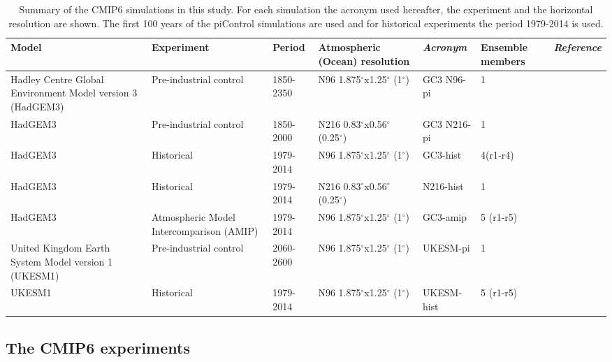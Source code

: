 \begin{sidewaystable}
\small
\caption{Summary of the CMIP6 simulations in this study. For each simulation the acronym used hereafter, the experiment and the horizontal resolution are shown. The first 100 years of the piControl simulations are used and for historical experiments the period 1979-2014 is used.}
\begin{tabular}{p{4.5cm}|p{}p{}p{2.95cm}p{2.53cm}p{2cm}p{3.8cm}} \label{tab:Sexps} \small
 Model & Experiment & Period & Atmospheric (Ocean) resolution & \textit{Acronym}  & Ensemble members & \textit{Reference}                 \\ \hline \hline

Hadley Centre Global Environment Model version 3 (HadGEM3)    &  Pre-industrial control  & 1850-2350 & N96 1.875$^\circ$x1.25$^\circ$ (1$^\circ$) & GC3 N96-pi      & 1 &   \citep{menary2018,gc3pi}                          \\
HadGEM3   &  Pre-industrial control & 1850-2000        & N216 0.83$^\circ$x0.56$^\circ$ (0.25$^\circ$) & GC3 N216-pi   & 1 & \citep{menary2018,n216pi}      \\
HadGEM3    &  Historical & 1979-2014       & N96 1.875$^\circ$x1.25$^\circ$ (1$^\circ$)  & GC3-hist     &  4(r1-r4) & \citep{andrews2020,gc3hist}                          \\
HadGEM3   &  Historical & 1979-2014        & N216 0.83$^\circ$x0.56$^\circ$ (0.25$^\circ$) & N216-hist   & 1 & \citep{n216pi}      \\
HadGEM3    &  Atmospheric Model Intercomparison (AMIP)  & 1979-2014 & N96 1.875$^\circ$x1.25$^\circ$ (1$^\circ$)  & GC3-amip   & 5 (r1-r5) &   \citep{gc3amip}                          \\
United Kingdom Earth System Model version 1 (UKESM1)   &  Pre-industrial control  & 2060-2600       & N96 1.875$^\circ$x1.25$^\circ$ (1$^\circ$) & UKESM-pi      & 1 & \citep{ukesmpi}            \\
UKESM1   &  Historical  & 1979-2014       & N96 1.875$^\circ$x1.25$^\circ$ (1$^\circ$) & UKESM-hist & 5 (r1-r5)     &  \citep{ukesmhist}            \\
\end{tabular}
\end{sidewaystable}

\subsection{The CMIP6 experiments}\label{sq:cmip6exp}

